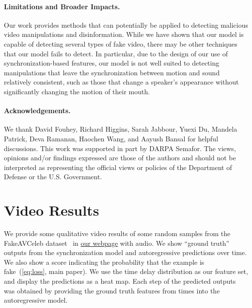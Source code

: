 \documentclass[10pt,twocolumn,letterpaper]{article}
\newcommand{\mypar}[1]{\vspace{-3mm}\paragraph{#1}}
\newcommand{\supparxiv}[2]{#2}
\begin{document}
\mypar{Limitations and Broader Impacts. } Our work provides methods that can potentially be applied to detecting malicious video manipulations and disinformation. While we have shown that our model is capable of detecting several types of fake video, there may be other techniques that our model fails to detect. In particular, due to the design of our use of synchronization-based features, our model is not well suited to detecting manipulations that leave the synchronization between motion and sound relatively consistent, such as those that change a speaker's appearance without significantly changing the motion of their mouth. 

\mypar{Acknowledgements.} We thank David Fouhey, Richard Higgins, Sarah Jabbour, Yuexi Du, Mandela Patrick, Deva Ramanan, Haochen Wang, and Aayush Bansal for helpful discussions. This work was supported in part by DARPA Semafor. The views, opinions and/or findings expressed are those of the authors and should not be interpreted as representing the official views or policies of the Department of Defense or the U.S. Government. 




 
{\small


}

\clearpage
\appendix
\supparxiv{
\setcounter{page}{1}
\twocolumn[{\renewcommand\twocolumn[1][]{#1}\begin{center}
    \vspace{-2.0em}
    {\bf \large Supplementary Material:\\Self-Supervised Video Forensics by Audio-Visual Anomaly Detection}
    \vspace{2.0em}
\end{center}

}]

}{}


\renewcommand{\thesection}{A.\arabic{section}}
\setcounter{section}{0}


\section{Video Results}
We provide some  qualitative video results of some random samples from the FakeAVCeleb dataset~\cite{NEURIPS_DATASETS_AND_BENCHMARKS2021_d9d4f495} in \href{https://cfeng16.github.io/audio-visual-forensics/}{our webpage} with audio. We show ``ground truth'' outputs from the synchronization model and autoregressive predictions over time. We also show a score indicating the probability that the example is fake~(\cref{eq:loss}, main paper). We use the time delay distribution as our feature set, and display the predictions as a heat map. Each step  of the predicted outputs was obtained by providing the ground truth features from times  into the autoregressive model.
\end{document}
